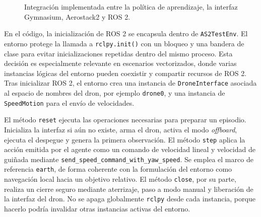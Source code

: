 \begin{figure}[t]
\centering
\shorthandoff{<>}
\shorthandon{<>}
\caption{Integración implementada entre la política de aprendizaje, la interfaz
Gymnasium, Aerostack2 y ROS 2.}
\label{fig:implementacion:integracion_ros_as2}
\end{figure}

En el código, la inicialización de ROS 2 se encapsula dentro de
\texttt{AS2TestEnv}. El entorno protege la llamada a \texttt{rclpy.init()} con un
bloqueo y una bandera de clase para evitar inicializaciones repetidas dentro del
mismo proceso. Esta decisión es especialmente relevante en escenarios
vectorizados, donde varias instancias lógicas del entorno pueden coexistir y
compartir recursos de ROS 2. Tras inicializar ROS 2, el entorno crea una instancia
de \texttt{DroneInterface} asociada al espacio de nombres del dron, por ejemplo
\texttt{drone0}, y una instancia de \texttt{SpeedMotion} para el envío de
velocidades.

El método \texttt{reset} ejecuta las operaciones necesarias para preparar un
episodio. Inicializa la interfaz si aún no existe, arma el dron, activa el modo
\emph{offboard}, ejecuta el despegue y genera la primera observación. El método
\texttt{step} aplica la acción emitida por el agente como
un comando de velocidad lineal y velocidad de guiñada mediante
\texttt{send\_speed\_command\_with\_yaw\_speed}. Se emplea el marco de referencia
\texttt{earth}, de forma coherente con la formulación del entorno como navegación
local hacia un objetivo relativo. El método \texttt{close}, por su parte, realiza
un cierre seguro mediante aterrizaje, paso a modo manual y liberación de la
interfaz del dron. No se apaga globalmente \texttt{rclpy} desde cada instancia,
porque hacerlo podría invalidar otras instancias activas del entorno.

